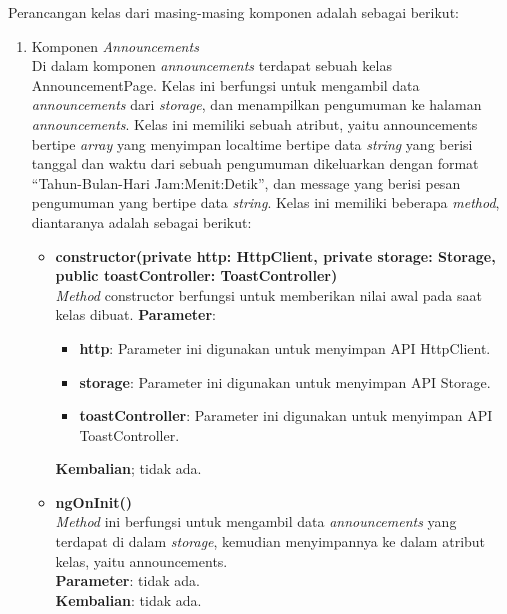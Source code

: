 Perancangan kelas dari masing-masing komponen adalah sebagai berikut:

\begin{enumerate}
	\item Komponen \textit{Announcements} \\
	Di dalam komponen \textit{announcements} terdapat sebuah kelas AnnouncementPage. Kelas ini berfungsi untuk mengambil data \textit{announcements} 	dari \textit{storage}, dan menampilkan pengumuman ke halaman \textit{announcements}. Kelas ini memiliki sebuah atribut, yaitu announcements bertipe \textit{array} yang menyimpan localtime bertipe data \textit{string} yang berisi tanggal dan waktu dari sebuah pengumuman dikeluarkan dengan format ``Tahun-Bulan-Hari Jam:Menit:Detik'', dan message yang berisi pesan pengumuman yang bertipe data \textit{string}. 
	Kelas ini memiliki beberapa \textit{method}, diantaranya adalah sebagai berikut:
	
	\begin{itemize}
		\item \textbf{constructor(private http: HttpClient, private storage: Storage, public toastController: ToastController)}\\
		\textit{Method} constructor berfungsi untuk memberikan nilai awal pada saat kelas dibuat.
		\textbf{Parameter}: 
		\begin{itemize}
			\item \textbf{http}: Parameter ini digunakan untuk menyimpan API HttpClient.
			\item \textbf{storage}: Parameter ini digunakan untuk menyimpan API Storage.
			\item \textbf{toastController}: Parameter ini digunakan untuk menyimpan API ToastController.
		\end{itemize}
		\textbf{Kembalian}; tidak ada.	
		
		\item \textbf{ngOnInit()}\\
		\textit{Method} ini berfungsi untuk mengambil data \textit{announcements} yang terdapat di dalam \textit{storage}, kemudian menyimpannya ke dalam atribut kelas, yaitu announcements. \\
		\textbf{Parameter}: tidak ada. \\
		\textbf{Kembalian}: tidak ada.	
		

\end{itemize}
\end{enumerate}
